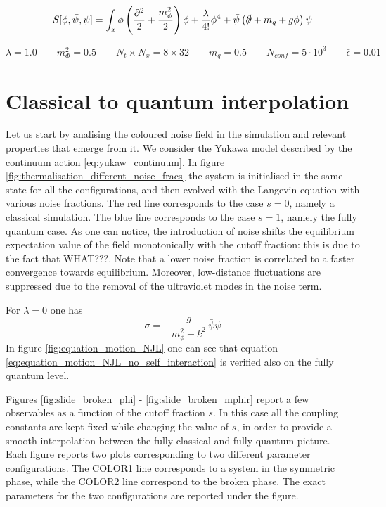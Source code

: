 \newpage

\begin{equation*}
    S[\phi, \bar\psi, \psi] = \int_x \phi \left(\frac{\partial^2}{2} + \frac{m_\phi^2}{2}\right) \phi + \frac{\lambda}{4!} \phi^4 + \bar \psi \left(\slashed{\partial} + m_q + g\phi\right) \psi
\end{equation*}

\begin{equation*} 
    \lambda = 1.0 \qquad m_\Phi^2 = 0.5 \qquad N_t \times N_x = 8 \times 32 \qquad m_q = 0.5 \qquad N_{conf} = 5 \cdot 10^3 \qquad \bar\epsilon = 0.01
\end{equation*}


\section{Classical to quantum interpolation}
\label{sec:classical_to_quantum}

Let us start by analising the coloured noise field in the simulation and relevant properties that emerge from it. We consider the Yukawa model described by the continuum action \ref{eq:yukaw_continuum}.
In figure \ref{fig:thermalisation_different_noise_fracs} the system is initialised in the same state for all the configurations, and then evolved with the Langevin equation with various noise fractions. The red line corresponds to the case $s=0$, namely a classical simulation. The blue line corresponds to the case $s=1$, namely the fully quantum case. As one can notice, the introduction of noise shifts the equilibrium expectation value of the field monotonically with the cutoff fraction: this is due to the fact that WHAT???. Note that a lower noise fraction is correlated to a faster convergence towards equilibrium. Moreover, low-distance fluctuations are suppressed due to the removal of the ultraviolet modes in the noise term.

For $\lambda = 0$ one has
\begin{equation}
    \sigma = -\frac{g}{m_\phi^2 + k^2} \, \bar\psi \psi
    \label{eq:equation_motion_NJL_no_self_interaction}
\end{equation}
In figure \ref{fig:equation_motion_NJL} one can see that equation \eqref{eq:equation_motion_NJL_no_self_interaction} is verified also on the fully quantum level.

Figures \ref{fig:slide_broken_phi} - \ref{fig:slide_broken_mphir} report a few observables as a function of the cutoff fraction $s$. In this case all the coupling constants are kept fixed while changing the value of $s$, in order to provide a smooth interpolation between the fully classical and fully quantum picture. \\
Each figure reports two plots corresponding to two different parameter configurations. The COLOR1 line corresponds to a system in the symmetric phase, while the COLOR2 line correspond to the broken phase. The exact parameters for the two configurations are reported under the figure.

